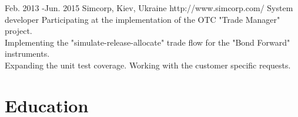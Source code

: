 \documentclass[10pt]{article} %
\begin{document}
\job
{Feb. 2013 -}{Jun. 2015}
{Simcorp, Kiev, Ukraine}
{http://www.simcorp.com/}
{System developer}
{Participating at the implementation of the OTC "Trade Manager" project. 
\\Implementing the "simulate-release-allocate" trade flow for the "Bond Forward" instruments. 
\\Expanding the unit test coverage. Working with the customer specific requests. \\
 }


\section{Education}

\end{document}
